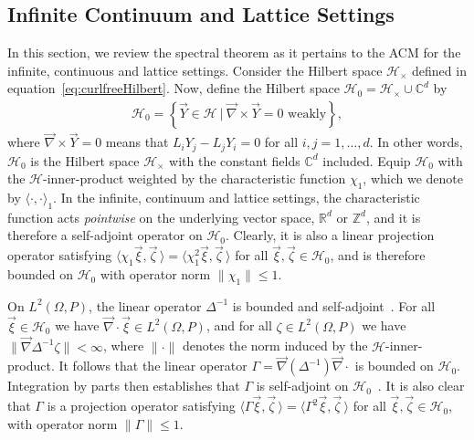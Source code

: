 \documentclass{cmslatex}
\begin{document}
\subsection{Infinite Continuum and Lattice Settings}
\label{sec:The_Spectral_Theorem_Continuum} 
%
In this section, we review the spectral theorem as it pertains to the
ACM for the infinite, continuous and lattice settings. Consider the
Hilbert space $\mathscr{H}_\times$ defined in
equation~\eqref{eq:curlfreeHilbert}. Now, define the Hilbert space 
$\mathscr{H}_0=\mathscr{H}_\times\cup\mathbb{C}^d$ by 
%
\begin{align}\label{eq:Hilbert0}
  \mathscr{H}_0=
  \left\{\vec{Y}\in \mathscr{H} \ | \ \vec{\nabla} \times\vec{Y}=0 \text{~weakly}
  \right\},
\end{align}
%
where $\vec{\nabla} \times\vec{Y}=0$ means that $L_iY_j-L_jY_i=0$ for all $i,j=1,\ldots,d$.
In other words, $\mathscr{H}_0$ is the Hilbert space $\mathscr{H}_\times$
with the constant fields $\mathbb{C}^d$ included. Equip $\mathscr{H}_0$ with the
$\mathscr{H}$-inner-product weighted by the characteristic function 
$\chi_1$, which we denote by $\langle\cdot,\cdot\rangle_1$. In the infinite, continuum and 
lattice settings, the characteristic function acts \emph{pointwise} on
the underlying vector space, $\mathbb{R}^d$ or $\mathbb{Z}^d$, and it is
therefore a self-adjoint operator on $\mathscr{H}_0$. Clearly, it is
also a linear projection operator satisfying
$\langle\chi_1\vec{\xi},\vec{\zeta}\,\rangle=\langle\chi_1^2\vec{\xi},\vec{\zeta}\,\rangle$ for all
$\vec{\xi},\vec{\zeta}\in\mathscr{H}_0$, and is therefore bounded on
$\mathscr{H}_0$ with operator norm $\|\chi_1\|\leq1$.

On $L^2(\Omega,P)$, the linear operator $\Delta^{-1}$ is bounded and
self-adjoint~\cite{Stakgold:BVP:2000}. For all $\vec{\xi}\in\mathscr{H}_0$
we have $\vec{\nabla}\cdot\vec{\xi}\in L^2(\Omega,P)$, and for all $\zeta\in L^2(\Omega,P)$ we have
$\|\vec{\nabla}\Delta^{-1}\zeta\|<\infty$, where $\|\cdot\|$ denotes the norm induced by the
$\mathscr{H}$-inner-product. It follows that  the linear operator
$\Gamma=\vec{\nabla}(\Delta^{-1})\vec{\nabla}\cdot$ is bounded on
$\mathscr{H}_0$. Integration by parts then
establishes that $\Gamma$ is self-adjoint on
$\mathscr{H}_0$~\cite{Golden:CMP-473}. It is also clear that $\Gamma$ is a  
projection operator satisfying
$\langle\Gamma\vec{\xi},\vec{\zeta}\,\rangle=\langle\Gamma^2\vec{\xi},\vec{\zeta}\,\rangle$ for all
$\vec{\xi},\vec{\zeta}\in\mathscr{H}_0$, with operator norm $\|\Gamma\|\leq1$.  
\end{document}
